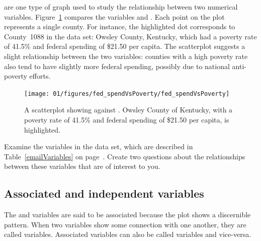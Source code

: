 


 are one type of graph used to study the relationship between two numerical variables. Figure~\ref{fed_spendVsPoverty} compares the variables  and . Each point on the plot represents a single county. For instance, the highlighted dot corresponds to County~1088 in the  data set: Owsley County, Kentucky, which had a poverty rate of 41.5\% and federal spending of \$21.50 per capita. The scatterplot suggests a slight relationship between the two variables: counties with a high poverty rate also tend to have slightly more federal spending, possibly due to national anti-poverty efforts.
\begin{figure}
\centering
\texttt{[image: 01/figures/fed\_spendVsPoverty/fed\_spendVsPoverty]}
\caption{A scatterplot showing  against . Owsley County of Kentucky, with a poverty rate of 41.5\% and federal spending of \$21.50 per capita, is highlighted.}
\label{fed_spendVsPoverty}
\end{figure}

\begin{exercise}
Examine the variables in the  data set, which are described in Table~\ref{emailVariables} on page~\pageref{emailVariables}. Create two questions about the relationships between these variables that are of interest to you.
\end{exercise}

\subsection{Associated and independent variables}
\label{associatedAndIndependentVariablesSubsection}

The  and  variables are said to be associated because the plot shows a discernible pattern. When two variables show some connection with one another, they are called  variables. Associated variables can also be called  variables and vice-versa.

